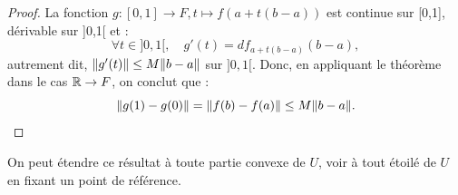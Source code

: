 \begin{proof}
La fonction $g : [0,1] \to F, t \mapsto f(a+t(b-a))$ est continue sur [0,1], dérivable sur ]0,1[ et :
\[ \forall t \in ]0,1[, \quad g'(t) = df_{a+t(b-a)}(b-a) , \]
autrement dit, $\lVert g'(t)\rVert \leq M \lVert b-a\rVert$ sur $]0,1[$. Donc, en appliquant le théorème dans le cas $\mathbb{R} \to F$, on conclut que :
\[ \lVert g(1) - g(0)\rVert = \lVert f(b)-f(a)\rVert \leq M \lVert b-a\rVert . \] 
\end{proof}

\begin{rmq}
On peut étendre ce résultat à toute partie convexe de $U$, voir à tout étoilé de $U$ en fixant un point de référence.
\end{rmq}

